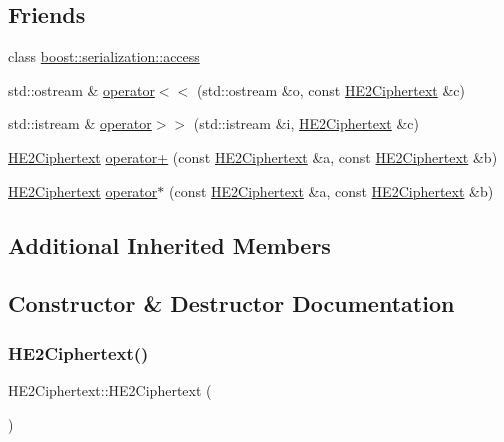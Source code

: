 \subsection*{Friends}
\begin{DoxyCompactItemize}
\item 
class \hyperlink{classHE2Ciphertext_ac98d07dd8f7b70e16ccb9a01abf56b9c}{boost\+::serialization\+::access}
\item 
std\+::ostream \& \hyperlink{classHE2Ciphertext_a5d9b4ffb87a447db8b95de9c64401e0f}{operator$<$$<$} (std\+::ostream \&o, const \hyperlink{classHE2Ciphertext}{H\+E2\+Ciphertext} \&c)
\item 
std\+::istream \& \hyperlink{classHE2Ciphertext_a8cd6e8f36f12e9b0548d6f66fae71816}{operator$>$$>$} (std\+::istream \&i, \hyperlink{classHE2Ciphertext}{H\+E2\+Ciphertext} \&c)
\item 
\hyperlink{classHE2Ciphertext}{H\+E2\+Ciphertext} \hyperlink{classHE2Ciphertext_af90fd206e69fa74b30d40f41f707bdb8}{operator+} (const \hyperlink{classHE2Ciphertext}{H\+E2\+Ciphertext} \&a, const \hyperlink{classHE2Ciphertext}{H\+E2\+Ciphertext} \&b)
\item 
\hyperlink{classHE2Ciphertext}{H\+E2\+Ciphertext} \hyperlink{classHE2Ciphertext_adfb636b8ce661b0edbd9297cdcf61c88}{operator$\ast$} (const \hyperlink{classHE2Ciphertext}{H\+E2\+Ciphertext} \&a, const \hyperlink{classHE2Ciphertext}{H\+E2\+Ciphertext} \&b)
\end{DoxyCompactItemize}
\subsection*{Additional Inherited Members}


\subsection{Constructor \& Destructor Documentation}
\mbox{\label{classHE2Ciphertext_ad5bfed280b98c618f55fb7bf28a7b1cd}} 
\subsubsection{\texorpdfstring{H\+E2\+Ciphertext()}{HE2Ciphertext()}\hspace{0.1cm}{\footnotesize\ttfamily [1/4]}}
{\footnotesize\ttfamily H\+E2\+Ciphertext\+::\+H\+E2\+Ciphertext (\begin{DoxyParamCaption}{ }\end{DoxyParamCaption})}

